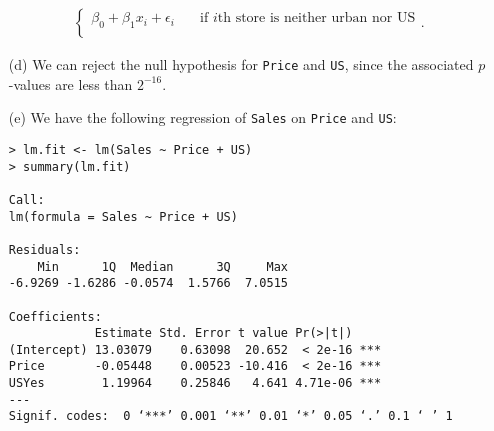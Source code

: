 \begin{itemize}
\begin{equation*}
\begin{split}
\begin{cases}
                    \beta_0 + \beta_1x_i + \epsilon_i \quad 
                        &\text{if $i$th store is neither urban nor US} \\
                \end{cases}.
            \end{split}
        \end{equation*}
    \item[(d)] We can reject the null hypothesis for \verb|Price| and \verb|US|, since 
        the associated $p$-values are less than $2^{-16}$.
    \item[(e)] We have the following regression of \verb|Sales| on \verb|Price| and
        \verb|US|:
        \scriptsize\begin{verbatim}
> lm.fit <- lm(Sales ~ Price + US)
> summary(lm.fit)

Call:
lm(formula = Sales ~ Price + US)

Residuals:
    Min      1Q  Median      3Q     Max 
-6.9269 -1.6286 -0.0574  1.5766  7.0515 

Coefficients:
            Estimate Std. Error t value Pr(>|t|)    
(Intercept) 13.03079    0.63098  20.652  < 2e-16 ***
Price       -0.05448    0.00523 -10.416  < 2e-16 ***
USYes        1.19964    0.25846   4.641 4.71e-06 ***
---
Signif. codes:  0 ‘***’ 0.001 ‘**’ 0.01 ‘*’ 0.05 ‘.’ 0.1 ‘ ’ 1


\end{verbatim}
\end{itemize}
